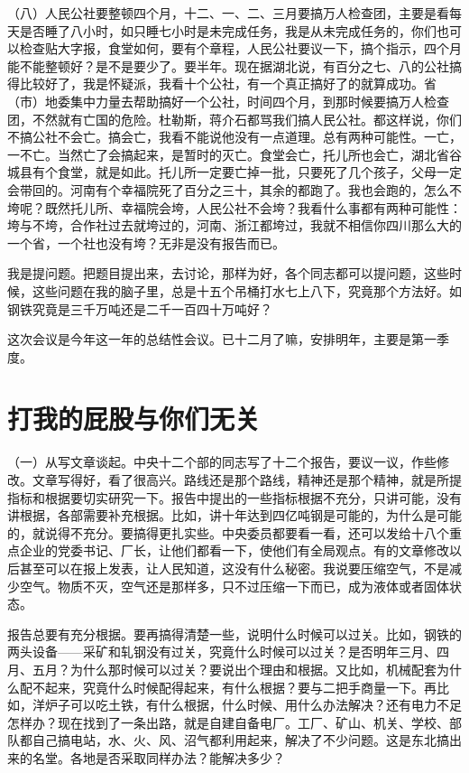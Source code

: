 （八）人民公社要整顿四个月，十二、一、二、三月要搞万人检查团，主要是看每天是否睡了八小时，如只睡七小时是未完成任务，我是从未完成任务的，你们也可以检查贴大字报，食堂如何，要有个章程，人民公社要议一下，搞个指示，四个月能不能整顿好？是不是要少了。要半年。现在据湖北说，有百分之七、八的公社搞得比较好了，我是怀疑派，我看十个公社，有一个真正搞好了的就算成功。省（市）地委集中力量去帮助搞好一个公社，时间四个月，到那时候要搞万人检查团，不然就有亡国的危险。杜勒斯，蒋介石都骂我们搞人民公社。都这样说，你们不搞公社不会亡。搞会亡，我看不能说他没有一点道理。总有两种可能性。一亡，一不亡。当然亡了会搞起来，是暂时的灭亡。食堂会亡，托儿所也会亡，湖北省谷城县有个食堂，就是如此。托儿所一定要亡掉一批，只要死了几个孩子，父母一定会带回的。河南有个幸福院死了百分之三十，其余的都跑了。我也会跑的，怎么不垮呢？既然托儿所、幸福院会垮，人民公社不会垮？我看什么事都有两种可能性：垮与不垮，合作社过去就垮过的，河南、浙江都垮过，我就不相信你四川那么大的一个省，一个社也没有垮？无非是没有报告而已。

我是提问题。把题目提出来，去讨论，那样为好，各个同志都可以提问题，这些时候，这些问题在我的脑子里，总是十五个吊桶打水七上八下，究竟那个方法好。如钢铁究竟是三千万吨还是二千一百四十万吨好？

这次会议是今年这一年的总结性会议。已十二月了嘛，安排明年，主要是第一季度。

\date{一九五八年十一月二十三日}
\section{打我的屁股与你们无关}

（一）从写文章谈起。中央十二个部的同志写了十二个报告，要议一议，作些修改。文章写得好，看了很高兴。路线还是那个路线，精神还是那个精神，就是所提指标和根据要切实研究一下。报告中提出的一些指标根据不充分，只讲可能，没有讲根据，各部需要补充根据。比如，讲十年达到四亿吨钢是可能的，为什么是可能的，就说得不充分。要搞得更扎实些。中央委员都要看一看，还可以发给十八个重点企业的党委书记、厂长，让他们都看一下，使他们有全局观点。有的文章修改以后甚至可以在报上发表，让人民知道，这没有什么秘密。我说要压缩空气，不是减少空气。物质不灭，空气还是那样多，只不过压缩一下而已，成为液体或者固体状态。

报告总要有充分根据。要再搞得清楚一些，说明什么时候可以过关。比如，钢铁的两头设备——采矿和轧钢没有过关，究竟什么时候可以过关？是否明年三月、四月、五月？为什么那时候可以过关？要说出个理由和根据。又比如，机械配套为什么配不起来，究竟什么时候配得起来，有什么根据？要与二把手商量一下。再比如，洋炉子可以吃土铁，有什么根据，什么时候、用什么办法解决？还有电力不足怎样办？现在找到了一条出路，就是自建自备电厂。工厂、矿山、机关、学校、部队都自己搞电站，水、火、风、沼气都利用起来，解决了不少问题。这是东北搞出来的名堂。各地是否采取同样办法？能解决多少？

